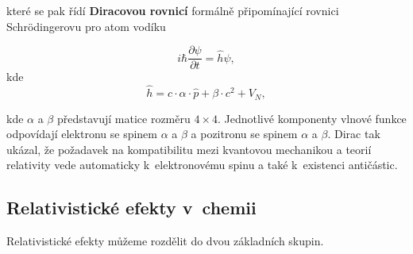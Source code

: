 \noindent které se pak řídí \textbf{Diracovou rovnicí} formálně připomínající rovnici Schr\"odingerovu pro atom vodíku

\begin{equation}
i \hbar \frac{\partial \psi}{\partial t} = \hat{h} \psi,
\label{rov:Rel-8}
\end{equation}
kde
\begin{equation}
\hat{h} = c \cdot \alpha \cdot \hat{p} + \beta \cdot c^2 + V_N,
\label{rov:Rel-9}
\end{equation}

\noindent kde $\alpha$ a $\beta$ představují matice rozměru $4 \times 4$. Jednotlivé komponenty vlnové funkce odpovídají elektronu se spinem $\alpha$ a $\beta$ a pozitronu se spinem $\alpha$ a $\beta$. Dirac tak ukázal, že požadavek na kompatibilitu mezi kvantovou mechanikou a teorií relativity vede automaticky k~elektronovému spinu a také k~existenci antičástic.  
    
  

\subsection{Relativistické efekty v~chemii}

Relativistické efekty můžeme rozdělit do dvou základních skupin. 

